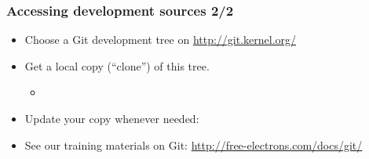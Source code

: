 \begin{frame}
  \frametitle{Accessing development sources 2/2}
  \begin{itemize}
  \item Choose a Git development tree on \url{http://git.kernel.org/}
  \item Get a local copy (“clone”) of this tree.
    \begin{itemize}
    \item {}
    \end{itemize}
  \item Update your copy whenever needed: 
  \item See our training materials on Git: \url{http://free-electrons.com/docs/git/}
  \end{itemize}
\end{frame}
